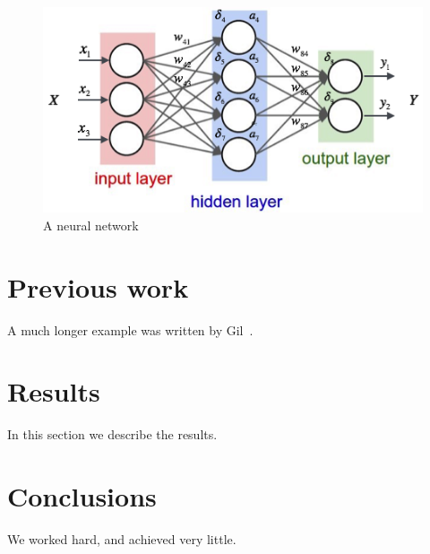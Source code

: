 \documentclass[12pt]{article}
\begin{document}
\begin{figure}[H]
  \includegraphics[width=\linewidth]{images/nn.png}
  \caption{A neural network}
\end{figure}

\section{Previous work}\label{previous work}
A much longer \LaTeXe{} example was written by Gil~\cite{Gil:02}.

\section{Results}\label{results}
In this section we describe the results.

\section{Conclusions}\label{conclusions}
We worked hard, and achieved very little.




\end{document}
